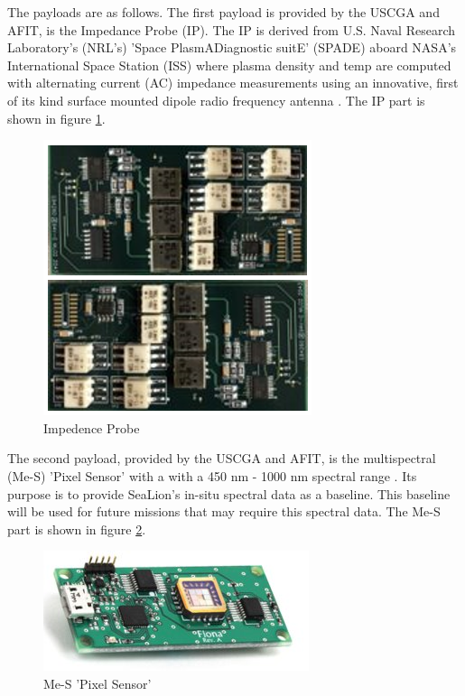 \documentclass[journal,article,submit,pdftex,moreauthors]{Definitions/mdpi}
\begin{document}
The payloads are as follows. The first payload is provided by the USCGA and AFIT, is the Impedance Probe (IP).  The IP is derived from U.S. Naval Research Laboratory's (NRL's) 'Space PlasmADiagnostic suitE' (SPADE) aboard NASA's International Space Station (ISS) where plasma density and temp are computed with alternating current (AC) impedance measurements using an innovative, first of its kind surface mounted dipole radio frequency antenna \cite{sealion_cdr}.  The IP part is shown in figure \ref{fig:IP}.

\begin{figure}[H]
    \includegraphics{assets/impedence.png}
    \caption{Impedence Probe}
	\label{fig:IP}
    \end{figure}
	\noindent   
\unskip

The second payload, provided by the USCGA and AFIT, is the multispectral (Me-S) 'Pixel Sensor' with a with a 450 nm - 1000 nm spectral range \cite{sealion_cdr}.  Its purpose is to provide SeaLion's in-situ spectral data as a baseline.  This baseline will be used for future missions that may require this spectral data.  The Me-S part is shown in figure \ref{fig:Me-S}. 

\begin{figure}[H]
    \includegraphics{assets/spectral.png}
    \caption{Me-S 'Pixel Sensor'}
	\label{fig:Me-S}
    \end{figure}
	\noindent   
\unskip
\end{document}
